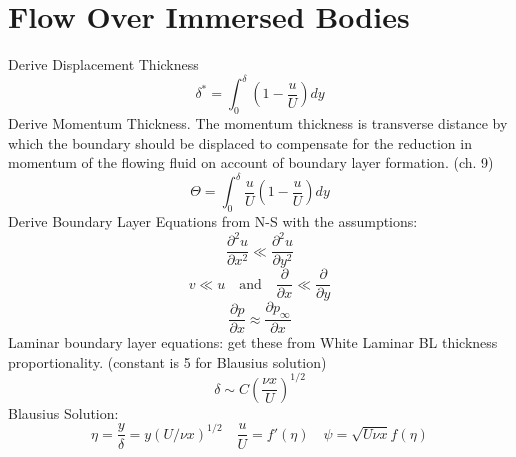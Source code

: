 \documentclass{article}
\begin{document}
%
%
\newpage
\section{Flow Over Immersed Bodies}

Derive Displacement Thickness
\begin{equation}
  \delta^* = \int_0^\delta (1-\frac{u}{U})dy
\end{equation}
\newline
\newline
Derive Momentum Thickness. The momentum thickness is transverse distance by which the boundary should be displaced to compensate for the reduction in momentum of the flowing fluid on account of boundary layer formation. (ch. 9)
\begin{equation}
  \Theta = \int_0^\delta \frac{u}{U}(1-\frac{u}{U})dy
\end{equation}
\newline
\newline
Derive Boundary Layer Equations from N-S with the assumptions:
\begin{equation}
  \frac{\partial^2 u}{\partial x^2} \ll \frac{\partial^2 u}{\partial y^2}
\end{equation}
\begin{equation}
  v \ll u\quad\text{and}\quad\frac{\partial}{\partial x} \ll \frac{\partial}{\partial y}
\end{equation}
\begin{equation}
  \frac{\partial p}{\partial x} \approx \frac{\partial p_\infty}{\partial x}
\end{equation}
\newline
\newline
Laminar boundary layer equations: get these from White
\newline
\newline
Laminar BL thickness proportionality. (constant is 5 for Blausius solution)
\begin{equation}
  \delta \sim C\left(\frac{\nu x}{U}\right)^{1/2}
\end{equation}
\newline
\newline
Blausius Solution:
\begin{equation}
  \eta=\frac{y}{\delta}=y(U/\nu x)^{1/2}\quad\frac{u}{U}=f'(\eta)\quad\psi = \sqrt{U\nu x}f(\eta)
\end{equation}
\end{document}
